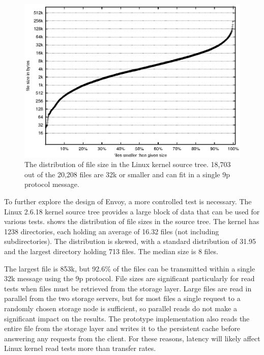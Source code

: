 \begin{figure}[t]
\centering
\includegraphics[width=\figwidth]{figures/linux-sizes}
\caption[Distribution of Linux kernel file sizes]{The distribution of file size in the Linux kernel source tree. 18,703 out of the 20,208 files are 32k or smaller and can fit in a single 9p protocol message.}
\label{fig:linux-sizes}
\end{figure}

To further explore the design of Envoy, a more controlled test is necessary. The Linux 2.6.18 kernel source tree provides a large block of data that can be used for various tests.  shows the distribution of file sizes in the source tree. The kernel has 1238 directories, each holding an average of 16.32 files (not including subdirectories). The distribution is skewed, with a standard distribution of 31.95 and the largest directory holding 713 files. The median size is 8 files.

The largest file is 853k, but 92.6\% of the files can be transmitted within a single 32k message using the 9p protocol. File sizes are significant particularly for read tests when files must be retrieved from the storage layer. Large files are read in parallel from the two storage servers, but for most files a single request to a randomly chosen storage node is sufficient, so parallel reads do not make a significant impact on the results. The prototype implementation also reads the entire file from the storage layer and writes it to the persistent cache before answering any requests from the client. For these reasons, latency will likely affect Linux kernel read tests more than transfer rates.


